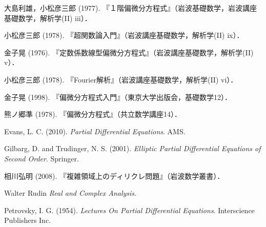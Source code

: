 \documentclass[uplatex,dvipdfmx]{jsreport}
\begin{document}

\begin{thebibliography}{99}
    \item 
    大島利雄，小松彦三郎 (1977). 『１階偏微分方程式』（岩波基礎数学，岩波講座基礎数学，解析学(II) iii）．
    \item 
    小松彦三郎 (1978). 『超関数論入門』（岩波講座基礎数学，解析学(II) ix）．
    \item 
    金子晃 (1976). 『定数係数線型偏微分方程式』（岩波講座基礎数学，解析学(II) v）．
    \item 
    小松彦三郎 (1978). 『Fourier解析』（岩波講座基礎数学，解析学(II) vi）．
    \item 
    金子晃 (1998). 『偏微分方程式入門』（東京大学出版会，基礎数学12）．
    \item 
    熊ノ郷準 (1978). 『偏微分方程式』（共立数学講座14）．

    \item 
    Evans, L. C. (2010). \textit{Partial Differential Equations}. AMS.
    \item 
    Gilbarg, D. and Trudinger, N. S. (2001). \textit{Elliptic Partial Differential Equations of Second Order}. Springer.
    \item 
    相川弘明 (2008). 『複雑領域上のディリクレ問題』（岩波数学叢書）．
    \item 
    Walter Rudin \textit{Real and Complex Analysis}.

    \item 
    Petrovsky, I. G. (1954). \textit{Lectures On Partial Differential Equations}. Interscience Publishers Inc.
\end{thebibliography}
\end{document}

